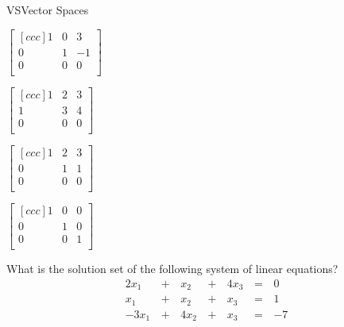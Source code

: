 \documentclass{article}
\begin{document}
\begin{module}{VS}{Vector Spaces}
\begin{readinessAssuranceTest}
  \begin{multicols}{4}
  \begin{readinessAssuranceTestChoices}
  \item
    \(
      \begin{bmatrix}[ccc]
        1 & 0 & 3 \\
        0 & 1 & -1 \\
        0 & 0 & 0 \\
      \end{bmatrix}
    \)
  \item
    \(
      \begin{bmatrix}[ccc]
        1 & 2 & 3 \\
        1 & 3 & 4 \\
        0 & 0 & 0 \\
      \end{bmatrix}
    \)
  \item
    \(
      \begin{bmatrix}[ccc]
        1 & 2 & 3 \\
        0 & 1 & 1 \\
        0 & 0 & 0 \\
      \end{bmatrix}
    \)
  \item
    \(
      \begin{bmatrix}[ccc]
        1 & 0 & 0 \\
        0 & 1 & 0 \\
        0 & 0 & 1 \\
      \end{bmatrix}
    \) %
  \end{readinessAssuranceTestChoices}
  \end{multicols}

  \item What is the solution set of the following system of linear equations?
  \begin{alignat*}{4}
    2x_1 &\,+\,& x_2 &\,+\,& 4x_3 &\,=\,& 0 \\
     x_1 &\,+\,& x_2 &\,+\,&  x_3 &\,=\,& 1 \\
   -3x_1 &\,+\,& 4x_2 &\,+\,& x_3 &\,=\,& -7 \\
  \end{alignat*}

  \begin{multicols}{4}
  \begin{readinessAssuranceTestChoices}


\end{readinessAssuranceTestChoices}
\end{multicols}
\end{readinessAssuranceTest}
\end{module}
\end{document}
